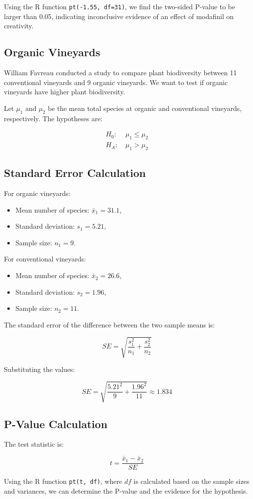 \documentclass{article}
\begin{document}
Using the R function \texttt{pt(-1.55, df=31)}, we find the two-sided P-value to be larger than 0.05, indicating inconclusive evidence of an effect of modafinil on creativity.

\subsection{Organic Vineyards}

William Favreau conducted a study to compare plant biodiversity between 11 conventional vineyards and 9 organic vineyards. We want to test if organic vineyards have higher plant biodiversity.

Let \( \mu_1 \) and \( \mu_2 \) be the mean total species at organic and conventional vineyards, respectively. The hypotheses are:

\[
\begin{aligned}
    H_0: & \ \mu_1 \leq \mu_2 \\
    H_A: & \ \mu_1 > \mu_2
\end{aligned}
\]

\subsection{Standard Error Calculation}

For organic vineyards:
\begin{itemize}
    \item Mean number of species: \( \bar{x}_1 = 31.1 \),
    \item Standard deviation: \( s_1 = 5.21 \),
    \item Sample size: \( n_1 = 9 \).
\end{itemize}

For conventional vineyards:
\begin{itemize}
    \item Mean number of species: \( \bar{x}_2 = 26.6 \),
    \item Standard deviation: \( s_2 = 1.96 \),
    \item Sample size: \( n_2 = 11 \).
\end{itemize}

The standard error of the difference between the two sample means is:

\[
SE = \sqrt{\frac{s_1^2}{n_1} + \frac{s_2^2}{n_2}}
\]

Substituting the values:

\[
SE = \sqrt{\frac{5.21^2}{9} + \frac{1.96^2}{11}} \approx 1.834
\]

\subsection{P-Value Calculation}

The test statistic is:

\[
t = \frac{\bar{x}_1 - \bar{x}_2}{SE}
\]

Using the R function \texttt{pt(t, df)}, where \( df \) is calculated based on the sample sizes and variances, we can determine the P-value and the evidence for the hypothesis.
\end{document}
